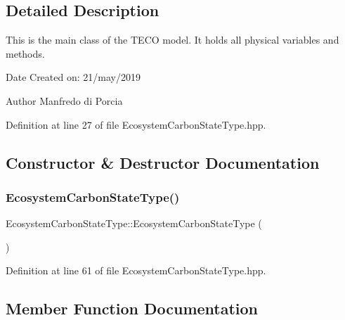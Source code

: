 \subsection{Detailed Description}
This is the main class of the T\+E\+CO model. It holds all physical variables and methods. 

\begin{DoxyDate}{Date}
Created on\+: 21/may/2019 
\end{DoxyDate}
\begin{DoxyAuthor}{Author}
Manfredo di Porcia 
\end{DoxyAuthor}


Definition at line 27 of file Ecosystem\+Carbon\+State\+Type.\+hpp.



\subsection{Constructor \& Destructor Documentation}
\mbox{\label{class_ecosystem_carbon_state_type_a88c8eda06ce5e4bd306220280718939a}} 
\subsubsection{\texorpdfstring{Ecosystem\+Carbon\+State\+Type()}{EcosystemCarbonStateType()}}
{\footnotesize\ttfamily Ecosystem\+Carbon\+State\+Type\+::\+Ecosystem\+Carbon\+State\+Type (\begin{DoxyParamCaption}{ }\end{DoxyParamCaption})\hspace{0.3cm}{\ttfamily [inline]}}



Definition at line 61 of file Ecosystem\+Carbon\+State\+Type.\+hpp.



\subsection{Member Function Documentation}
\mbox{\label{class_ecosystem_carbon_state_type_af3682294ea4888ea45404b675e184bd0}} 
